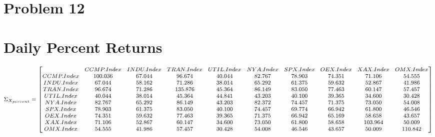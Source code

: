 \documentclass{article}
\begin{document}
\section*{Problem 12}
\section*{Daily Percent Returns}
\begin{equation*}
\begin{medsize}
\Sigma_{X_{percent}} = 
\begin{bmatrix}{}
  & CCMP.Index & INDU.Index & TRAN.Index & UTIL.Index & NYA.Index & SPX.Index & OEX.Index & XAX.Index & OMX.Index \\ 
 CCMP.Index & 100.036 & 67.044 & 96.674 & 40.044 & 82.767 & 78.903 & 74.351 & 71.106 & 54.555 \\ 
  INDU.Index & 67.044 & 58.162 & 71.286 & 38.014 & 65.292 & 61.375 & 59.632 & 52.867 & 41.986 \\ 
  TRAN.Index & 96.674 & 71.286 & 135.876 & 45.364 & 86.149 & 83.050 & 77.463 & 60.147 & 57.457 \\ 
  UTIL.Index & 40.044 & 38.014 & 45.364 & 44.841 & 43.203 & 40.100 & 39.365 & 34.600 & 30.428 \\ 
  NYA.Index & 82.767 & 65.292 & 86.149 & 43.203 & 82.372 & 74.457 & 71.375 & 73.050 & 54.008 \\ 
  SPX.Index & 78.903 & 61.375 & 83.050 & 40.100 & 74.457 & 69.774 & 66.942 & 61.800 & 46.546 \\ 
  OEX.Index & 74.351 & 59.632 & 77.463 & 39.365 & 71.375 & 66.942 & 65.169 & 58.658 & 43.657 \\ 
  XAX.Index & 71.106 & 52.867 & 60.147 & 34.600 & 73.050 & 61.800 & 58.658 & 103.964 & 50.009 \\ 
  OMX.Index & 54.555 & 41.986 & 57.457 & 30.428 & 54.008 & 46.546 & 43.657 & 50.009 & 110.842 \\ 
  \end{bmatrix}
\end{medsize}
\end{equation*}
\end{document}
